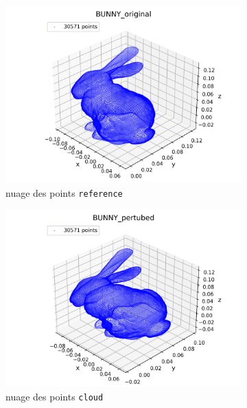 \documentclass[../5RO17_TP4.tex]{subfiles}
\begin{document}
\begin{figure}[H]
    \centering
    \begin{subfigure}[b]{0.325\textwidth}
        \centering
        \includegraphics[width=\linewidth]{images/BUNNY_original.png}
        \caption{nuage des points \texttt{reference}}
        \label{}
    \end{subfigure}\hfill
    \begin{subfigure}[b]{0.325\textwidth}
        \centering
        \includegraphics[width=\linewidth]{images/BUNNY_pertubed.png}
        \caption{nuage des points \texttt{cloud}}
        \label{}
    \end{subfigure}\hfill
    \begin{subfigure}[b]{0.325\textwidth}

\end{subfigure}
\end{figure}
\end{document}
